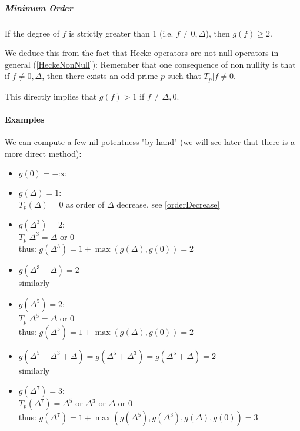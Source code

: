\subparagraph{Minimum Order}
\label{MinimumOrderNilpotencyHeckeOperators}
If the degree of $f$ is strictly greater than 1 (i.e. $f \neq 0, \Delta$), then $g(f) \geq 2$.

We deduce this from the fact that Hecke operators are not null operators in general (\ref{HeckeNonNull}):
Remember that one consequence of non nullity is that if $f \neq 0, \Delta$, then there exists an odd prime $p$ such that $T_p|f \neq 0$.

This directly implies that $g(f) > 1$ if $f \neq \Delta, 0$.

\paragraph{Examples}
We can compute a few nil potentness "by hand" (we will see later that there is a more direct method):
\begin{itemize}
	\item $g(0) = -\infty$
	
	\item $g(\Delta) = 1$:\\
	$
	T_p(\Delta) = 0
	$
	as order of $\Delta$ decrease, see \ref{orderDecrease}
	
	\item $g(\Delta^3) = 2$:\\
	$
	T_p|\Delta^3 = \Delta \text{ or } 0
	$\\
	thus:
	$
	g(\Delta^3) = 1 + \max(g(\Delta), g(0)) = 2
	$
	
	\item $g(\Delta^3+\Delta) = 2$\\
	similarly
	
	\item $g(\Delta^5) = 2$:\\
	$
	T_p|\Delta^5 = \Delta \text{ or } 0
	$\\
	thus:
	$
	g(\Delta^5) = 1 + \max(g(\Delta), g(0)) = 2
	$
	
	\item $g(\Delta^5+\Delta^3+\Delta) = g(\Delta^5+\Delta^3) = g(\Delta^5+\Delta) = 2$\\
	similarly
	
	\item $g(\Delta^7) = 3$:\\
	$
	T_p(\Delta^7) = \Delta^5 \text{ or } \Delta^3 \text{ or }  \Delta \text{ or } 0
	$\\
	thus:
	$
	g(\Delta^7) = 1 + \max(g(\Delta^5), g(\Delta^3), g(\Delta), g(0)) = 3
	$
\end{itemize}
